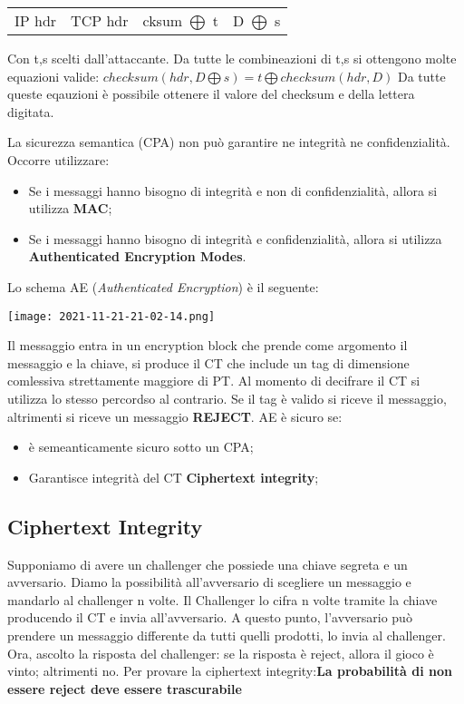 \documentclass{article}
\theoremstyle{remark}
\begin{document}
\begin{itemize}
\begin{itemize}
\begin{center}
                \begin{tabular}{|c|c|c|c|}
                    IP hdr & TCP hdr & cksum $\bigoplus$ t & D $\bigoplus$ s\\
                \end{tabular}
            \end{center}
            Con t,s scelti dall'attaccante. Da tutte le combineazioni di t,s si ottengono molte equazioni valide:
            \newline\(checksum(hdr,D\bigoplus s)=t\bigoplus checksum(hdr,D)\)\newline
            Da tutte queste eqauzioni è possibile ottenere il valore del checksum e della lettera digitata.
    \end{itemize}
\end{itemize}
La sicurezza semantica (CPA) non può garantire ne integrità ne confidenzialità. Occorre utilizzare:
\begin{itemize}
    \item Se i messaggi hanno bisogno di integrità e non di confidenzialità, allora si utilizza \textbf{MAC};
    \item Se i messaggi hanno bisogno di integrità e confidenzialità, allora si utilizza \textbf{Authenticated Encryption Modes}.
\end{itemize}
Lo schema AE (\emph{Authenticated Encryption}) è il seguente:
\begin{center}
    \texttt{[image: 2021-11-21-21-02-14.png]}
\end{center}
Il messaggio entra in un encryption block che prende come argomento il messaggio e la chiave, si produce il CT che include un tag
di dimensione comlessiva strettamente maggiore di PT. Al momento di decifrare il CT si utilizza lo stesso percordso al contrario.
Se il tag è valido si riceve il messaggio, altrimenti si riceve un messaggio \textbf{REJECT}.\newline
AE è sicuro se:
\begin{itemize}
    \item è semeanticamente sicuro sotto un CPA;
    \item Garantisce integrità del CT \textbf{Ciphertext integrity};
\end{itemize}
\subsection{Ciphertext Integrity}
Supponiamo di avere un challenger che possiede una chiave segreta e un avversario. Diamo la possibilità all'avversario di
scegliere un messaggio e mandarlo al challenger n volte. Il Challenger lo cifra n volte tramite la chiave producendo il CT
e invia all'avversario. A questo punto, l'avversario può prendere un messaggio differente da tutti quelli prodotti, lo invia
al challenger. Ora, ascolto la risposta del challenger: se la risposta è reject, allora il gioco è vinto; altrimenti no.\newline
Per provare la ciphertext integrity:\textbf{La probabilità di non essere reject deve essere trascurabile}\newline
\end{document}
